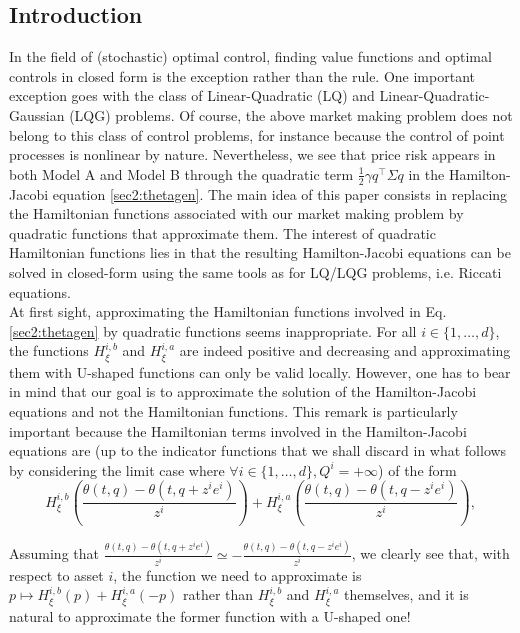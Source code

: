 \documentclass[preprint, 3p]{elsarticle}
\newcommand{\1}{{\chi}}
\begin{document}
\subsection{Introduction}
\vspace{3mm}
In the field of (stochastic) optimal control, finding value functions and optimal controls in closed form is the exception rather than the rule. One important exception goes with the class of Linear-Quadratic (LQ) and Linear-Quadratic-Gaussian (LQG) problems. Of course, the above market making problem does not belong to this class of control problems, for instance because the control of point processes is nonlinear by nature. Nevertheless, we see that price risk appears in both Model A and Model B through the quadratic term $\frac 12 \gamma q^\intercal \Sigma q$ in the Hamilton-Jacobi equation \eqref{sec2:thetagen}. The main idea of this paper consists in replacing the Hamiltonian functions associated with our market making problem by quadratic functions that approximate them. The interest of quadratic Hamiltonian functions lies in that the resulting Hamilton-Jacobi equations can be solved in closed-form using the same tools as for LQ/LQG problems, i.e. Riccati equations.\\

At first sight, approximating the Hamiltonian functions involved in Eq. \eqref{sec2:thetagen} by quadratic functions seems inappropriate. For all $i \in \{1, \ldots, d\}$, the functions $H_\xi^{i,b}$ and $H_\xi^{i,a}$ are indeed positive and decreasing and approximating them with U-shaped functions can only be valid locally. However, one has to bear in mind that our goal is to approximate the solution of the Hamilton-Jacobi equations and not the Hamiltonian functions. This remark is particularly important because the Hamiltonian terms involved in the Hamilton-Jacobi equations are (up to the indicator functions that we shall discard in what follows by considering the limit case where $\forall i \in \{1, \ldots, d\}, Q^i = +\infty$) of the form $$H^{i,b}_\xi \left( \frac{\theta(t,q) - \theta(t,q+z^ie^i)}{z^i} \right) + H^{i,a}_\xi \left( \frac{\theta(t,q) - \theta(t,q-z^ie^i)}{z^i} \right),$$

Assuming that $\frac{\theta(t,q) - \theta(t,q+z^ie^i)}{z^i} \simeq - \frac{\theta(t,q) - \theta(t,q-z^ie^i)}{z^i}$, we clearly see that, with respect to asset $i$, the function we need to approximate is $p \mapsto H^{i,b}_\xi(p) + H^{i,a}_\xi(-p)$ rather than $H^{i,b}_\xi$ and $H^{i,a}_\xi$ themselves, and it is natural to approximate the former function with a U-shaped one!\\
\end{document}
